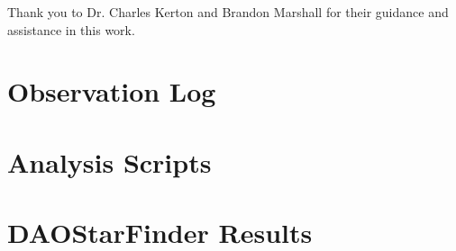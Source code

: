 \documentclass[%
aip,
jmp,
reprint,
floatfix,
]{revtex4-1}
\begin{document}
	Thank you to Dr. Charles Kerton and Brandon Marshall for their guidance and assistance in this work.
	
	
	
	
	
	\onecolumngrid
	\appendix
	
	\section{Observation Log}
	
	\begin{table}[H]
		\centering
		
		\label{table:log}
	\end{table}
	
	\section{Analysis Scripts}
	
	

	\section{DAOStarFinder Results}
	\begin{table}[H]
		\centering
		\caption{Table of the results from DAOStarFinder for each of the 10 photometric V \SI{0.1}{\second} exposures}
		
		\label{table:dao}
	\end{table}


	
\end{document}
